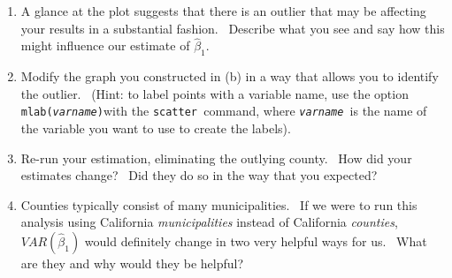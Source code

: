 \documentclass[11pt]{article}
\begin{document}
\begin{enumerate}
\begin{enumerate}
\item A glance at the plot suggests that there is an outlier that may be
affecting your results in a substantial fashion. \ Describe what you see and
say how this might influence our estimate of $\widehat{\beta }_{1}.$

\item Modify the graph you constructed in (b) in a way that allows you to
identify the outlier. \ (Hint: to label points with a variable name, use the
option \texttt{mlab(\textit{varname})}with the \texttt{scatter }command,
where \texttt{\textit{varname}}\textit{\ }is the name of the variable you
want to use to create the labels).

\item Re-run your estimation, eliminating the outlying county. \ How did
your estimates change? \ Did they do so in the way that you expected?

\item Counties typically consist of many municipalities. \ If we were to run
this analysis using California \textit{municipalities} instead of California 
\textit{counties}, $VAR\left( \widehat{\beta }_{1}\right) $ would definitely
change in two very helpful ways for us. \ What are they and why would they
be helpful?
\end{enumerate}
\end{enumerate}
\end{document}
